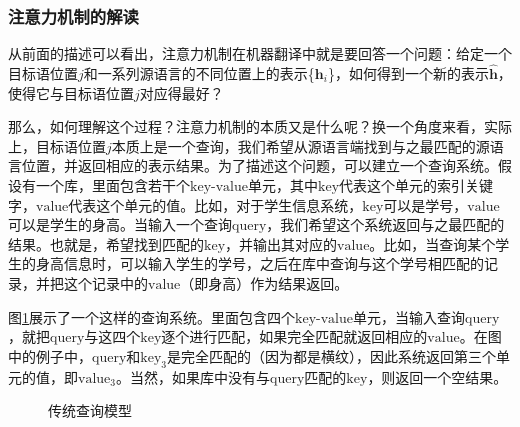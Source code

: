
\subsubsection{注意力机制的解读}
\label{sec:6.3.4.3}

\vspace{0.5em}
\parinterval 从前面的描述可以看出，注意力机制在机器翻译中就是要回答一个问题：给定一个目标语位置$j$和一系列源语言的不同位置上的表示\{${\mathbf{h}_i}$\}，如何得到一个新的表示$\hat{\mathbf{h}}$，使得它与目标语位置$j$对应得最好？

\parinterval 那么，如何理解这个过程？注意力机制的本质又是什么呢？换一个角度来看，实际上，目标语位置$j$本质上是一个查询，我们希望从源语言端找到与之最匹配的源语言位置，并返回相应的表示结果。为了描述这个问题，可以建立一个查询系统。假设有一个库，里面包含若干个$\mathrm{key}$-$\mathrm{value}$单元，其中$\mathrm{key}$代表这个单元的索引关键字，$\mathrm{value}$代表这个单元的值。比如，对于学生信息系统，$\mathrm{key}$可以是学号，$\mathrm{value}$可以是学生的身高。当输入一个查询$\mathrm{query}$，我们希望这个系统返回与之最匹配的结果。也就是，希望找到匹配的$\mathrm{key}$，并输出其对应的$\mathrm{value}$。比如，当查询某个学生的身高信息时，可以输入学生的学号，之后在库中查询与这个学号相匹配的记录，并把这个记录中的$\mathrm{value}$（即身高）作为结果返回。

\parinterval 图\ref{fig:6-26}展示了一个这样的查询系统。里面包含四个$\mathrm{key}$-$\mathrm{value}$单元，当输入查询$\mathrm{query}$，就把$\mathrm{query}$与这四个$\mathrm{key}$逐个进行匹配，如果完全匹配就返回相应的$\mathrm{value}$。在图中的例子中，$\mathrm{query}$和$\mathrm{key}_3$是完全匹配的（因为都是横纹），因此系统返回第三个单元的值，即$\mathrm{value}_3$。当然，如果库中没有与$\mathrm{query}$匹配的$\mathrm{key}$，则返回一个空结果。

\begin{figure}[htp]
\centering

\caption{传统查询模型}
\label{fig:6-26}
\end{figure}

